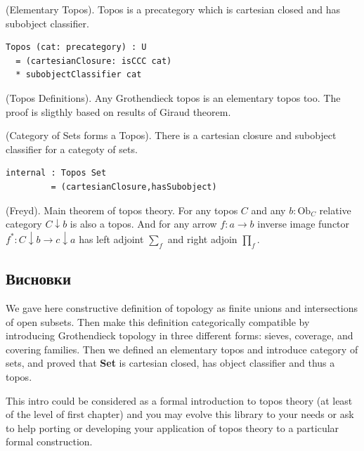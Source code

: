 \begin{definition} (Elementary Topos).
Topos is a precategory which is cartesian closed and has subobject classifier.
\begin{lstlisting}
Topos (cat: precategory) : U
  = (cartesianClosure: isCCC cat)
  * subobjectClassifier cat
\end{lstlisting}
\end{definition}

\begin{theorem} (Topos Definitions).
Any Grothendieck topos is an elementary topos too.
The proof is sligthly based on results of Giraud theorem.
\end{theorem}

\begin{theorem} (Category of Sets forms a Topos).
There is a cartesian closure and subobject classifier for a categoty of sets.
\begin{lstlisting}
internal : Topos Set
         = (cartesianClosure,hasSubobject)
\end{lstlisting}
\end{theorem}

\begin{theorem} (Freyd). Main theorem of topos theory\cite{Goldblatt14}.
For any topos $C$ and any $b : \mathrm{Ob}_C$ relative category $C\downarrow b$ is also a topos.
And for any arrow $f: a \rightarrow b$ inverse image functor $f^*: C\downarrow b \rightarrow c\downarrow a$
has left adjoint $\sum_f$ and right adjoin $\prod_f$.
\end{theorem}

\subsection{Висновки}

We gave here constructive definition of topology as finite unions and
intersections of open subsets. Then make this definition categorically
compatible by introducing Grothendieck topology in three different forms: sieves, coverage,
and covering families. Then we defined an elementary topos and introduce category of sets,
and proved that {\bf Set} is cartesian closed, has object classifier and thus a topos.

This intro could be considered as a formal introduction to topos theory (at least of the level of first chapter)
and you may evolve this library to your needs or ask to help porting or developing your application
of topos theory to a particular formal construction.

